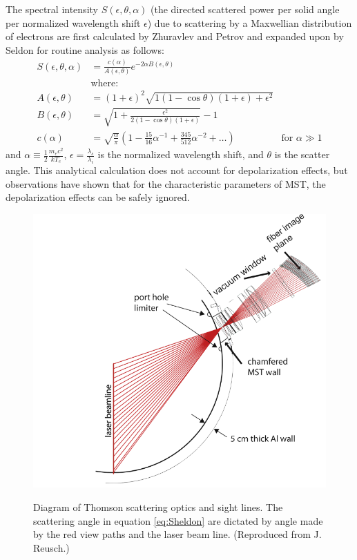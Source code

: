 The spectral intensity $S(\epsilon, \theta, \alpha)$ (the directed scattered power per solid angle per normalized  wavelength shift $\epsilon$) due to scattering by a Maxwellian distribution of electrons are first calculated by Zhuravlev and Petrov\cite{Zhuravlev1979} and expanded upon by Seldon\cite{Seldon1980} for routine analysis as follows:
\begin{align}
    S(\epsilon, \theta, \alpha) &= \frac{c(\alpha)}{A(\epsilon, \theta)}e^{-2\alpha B(\epsilon,\theta)} \label{eq:Sheldon}\\
    &\text{where:}\nonumber\\
    A (\epsilon, \theta) &= (1+\epsilon)^2\sqrt{1(1- \cos\theta)(1+\epsilon) + \epsilon^2} \nonumber\\
    B (\epsilon, \theta) &= \sqrt{1 + \frac{\epsilon^2}{2(1-\cos\theta)(1+\epsilon)}} - 1 \nonumber\\
    c (\alpha) &= \sqrt{\frac{\alpha}{\pi}}(1 - \frac{15}{16}\alpha^{-1} + \frac{345}{512}\alpha^{-2} + \ldots) &\text{for } \alpha \gg 1 \nonumber
\end{align}
and $\alpha \equiv \frac{1}{2}\frac{m_ec^2}{kT_e}$, $\epsilon = \frac{\lambda_s}{\lambda_i}$ is the normalized wavelength shift, and $\theta$ is the scatter angle. This analytical calculation does not account for depolarization effects, but observations have shown that for the characteristic parameters of MST, the depolarization effects can be safely ignored\cite{Seldon1982}. 

\begin{figure}[!htb]
	\centering
	\includegraphics[width = 0.9\linewidth]{./implementation/diagnostics/ts_optics_diagram.png}
	\label{fig:ts_optics_diagram}
	\caption[Diagram of Thomson scattering optics and sight lines]{Diagram of Thomson scattering optics and sight lines. The scattering angle in equation \ref{eq:Sheldon} are dictated by angle made by the red view paths and the laser beam line. (Reproduced from J. Reusch.\cite{Reusch2011})}
\end{figure}

